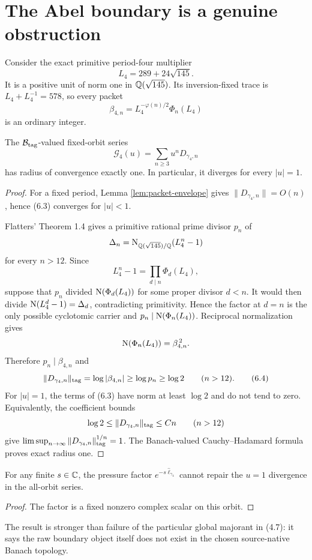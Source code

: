 \section{The Abel boundary is a genuine obstruction}\label{sec:boundary}

Consider the exact primitive period-four multiplier
\[
L_4=289+24\sqrt{145}.
\tag{6.1}
\]
It is a positive unit of norm one in $\mathbb Q(\sqrt{145})$.  Its inversion-fixed
trace is $L_4+L_4^{-1}=578$, so every packet
\[
\beta_{4,n}=L_4^{-\varphi(n)/2}\Phi_n(L_4)
\tag{6.2}
\]
is an ordinary integer.

\begin{theorem}\label{thm:boundary}
The $\mathcal B_{\mathrm{tag}}$-valued fixed-orbit series
\[
\mathcal G_4(u)=\sum_{n\ge3}u^nD_{\gamma_4,n}
\tag{6.3}
\]
has radius of convergence exactly one.  In particular, it diverges for
every $|u|=1$.
\end{theorem}

\begin{proof}
For a fixed period, Lemma \ref{lem:packet-envelope} gives
$\|D_{\gamma_4,n}\|=O(n)$, hence (6.3) converges for $|u|<1$.

Flatters' Theorem 1.4 \cite{flatters2009} gives a primitive rational prime
divisor $p_n$ of
\[
\Delta_n=\operatorname{N}_{\mathbb Q(\sqrt{145})/\mathbb Q}(L_4^n-1)
\]
for every $n>12$.  Since
\[
L_4^n-1=\prod_{d\mid n}\Phi_d(L_4),
\]
suppose that $p_n$ divided $\operatorname{N}(\Phi_d(L_4))$ for some proper divisor
$d<n$.  It would then divide
$\operatorname{N}(L_4^d-1)=\Delta_d$, contradicting primitivity.  Hence the factor at
$d=n$ is the only possible cyclotomic carrier and
$p_n\mid\operatorname{N}(\Phi_n(L_4))$.  Reciprocal normalization gives
\[
\operatorname{N}(\Phi_n(L_4))=\beta_{4,n}^{\,2}.
\]
Therefore $p_n\mid\beta_{4,n}$ and
\[
\|D_{\gamma_4,n}\|_{\rm tag}
=\log|\beta_{4,n}|\ge\log p_n\ge\log2
\qquad(n>12).
\tag{6.4}
\]
For $|u|=1$, the terms of (6.3) have norm at least $\log2$ and do not tend
to zero.  Equivalently, the coefficient bounds
\[
\log2\le\|D_{\gamma_4,n}\|_{\rm tag}\le Cn
\qquad(n>12)
\]
give
$\limsup_{n\to\infty}\|D_{\gamma_4,n}\|_{\rm tag}^{1/n}=1$.
The Banach-valued Cauchy--Hadamard formula proves exact radius one.
\end{proof}

\begin{corollary}
For any finite $s\in\mathbb C$, the pressure factor
$e^{-s\widehat\ell_{\gamma_4}}$ cannot repair the $u=1$ divergence in the
all-orbit series.
\end{corollary}

\begin{proof}
The factor is a fixed nonzero complex scalar on this orbit.
\end{proof}

The result is stronger than failure of the particular global majorant in
(4.7): it says the raw boundary object itself does not exist in the chosen
source-native Banach topology.
